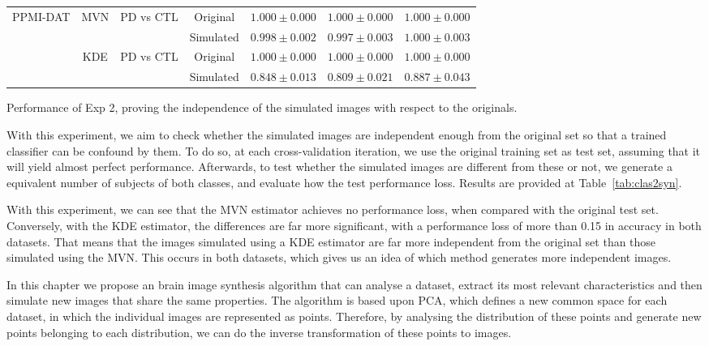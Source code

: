 \begin{bigtable}
\begin{tabular}{ccccccc}
		\midrule
		\multirow{4}{*}{PPMI-DAT} & \multirow{2}{*}{\ac{MVN}} & \multirow{2}{*}{\ac{PD} vs \ac{CTL}} & Original & $1.000 \pm 0.000 $ & $1.000 \pm 0.000 $ & $1.000 \pm 0.000 $\\
		& & &  Simulated & $0.998 \pm 0.002 $ & $0.997 \pm 0.003$ & $1.000 \pm 0.003$\\  \cline{2-7}
		& \multirow{2}{*}{\ac{KDE}} & \multirow{2}{*}{\ac{PD} vs \ac{CTL}} & Original & $1.000 \pm 0.000 $ & $1.000 \pm 0.000 $ & $1.000 \pm 0.000 $\\
		& & &  Simulated & $0.848 \pm 0.013 $ & $0.809 \pm 0.021$ & $0.887 \pm 0.043$\\ 
		\bottomrule 
	\end{tabular}
	\vspace{1em}
	\caption{Performance of Exp 2, proving the independence of the simulated images with respect to the originals.}
	\label{tab:clas2syn}
\end{bigtable}

With this experiment, we aim to check whether the simulated images are independent enough from the original set so that a trained classifier can be confound by them. To do so, at each cross-validation iteration, we use the original training set as test set, assuming that it will yield almost perfect performance. Afterwards, to test whether the simulated images are different from these or not, we generate a equivalent number of subjects of both classes, and evaluate how the test performance loss. Results are provided at Table~\ref{tab:clas2syn}. 

With this experiment, we can see that the \ac{MVN} estimator achieves no performance loss, when compared with the original test set. Conversely, with the \ac{KDE} estimator, the differences are far more significant, with a performance loss of more than 0.15 in accuracy in both datasets. That means that the images simulated using a \ac{KDE} estimator are far more independent from the original set than those simulated using the \ac{MVN}. This occurs in both datasets, which gives us an idea of which method generates more independent images. 

In this chapter we propose an brain image synthesis algorithm that can analyse a dataset, extract its most relevant characteristics and then simulate new images that share the same properties. The algorithm is based upon \ac{PCA}, which defines a new common space for each dataset, in which the individual images are represented as points. Therefore, by analysing the distribution of these points and generate new points belonging to each distribution, we can do the inverse transformation of these points to images. 

